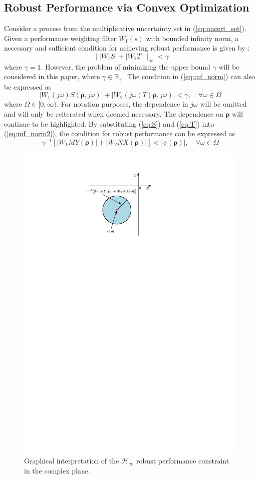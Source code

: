 \documentclass[letterpaper, 10 pt, conference]{ieeeconf}  %
\begin{document}
\subsection{Robust Performance via Convex Optimization}
Consider a process from the multiplicative uncertainty set in (\ref{eq:uncert_set}). Given a performance weighting filter $W_1(s)$ with bounded infinity norm, a necessary and sufficient condition for achieving robust performance is given by \cite{DFT92}:
\begin{equation}\label{eq:inf_norm}
\| |W_1 S| + |W_2 T| \|_{\infty} < \gamma
\end{equation}
where $\gamma = 1$. However, the problem of minimizing the upper bound $\gamma$ will be considered in this paper, where $ \gamma \in \mathbb{R}_+$. The condition in (\ref{eq:inf_norm}) can also be expressed as
\begin{equation} \label{eq:inf_norm2}
|W_1(j\omega)S(\bm{\rho},j\omega)|+|W_2(j\omega)T(\bm{\rho},j\omega)|<\gamma, \quad \forall \omega \in \Omega
\end{equation}
where $\Omega \in [0,\infty)$. For notation purposes, the dependence in $j\omega$ will be omitted and will only be reiterated when deemed necessary. The dependence on $\bm{\rho}$ will continue to be highlighted. By substituting (\ref{eq:S}) and (\ref{eq:T}) into (\ref{eq:inf_norm2}), the condition for robust performance can be expressed as
\begin{equation} \label{eq:circle}
\gamma^{-1}\left[ |W_1MY(\bm{\rho})| + |W_2 NX(\bm{\rho})| \right] < |\psi(\bm{\rho})|, \quad \forall \omega \in \Omega
\end{equation}

\begin{figure}
\centering
\includegraphics[width=0.7\columnwidth]{../pics/circle_rotation_RP.pdf}
\caption{Graphical interpretation of the $\mathcal{H}_\infty$ robust performance constraint in the complex plane.}
\label{fig:circle}
\end{figure}
\end{document}

